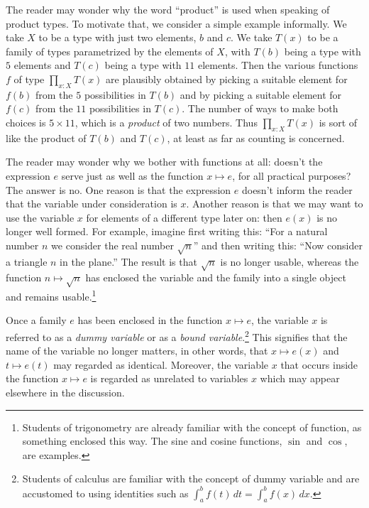 The reader may wonder why the word ``product'' is used when speaking of product types.  To motivate that, we consider a simple example
informally.  We take $X$ to be a type with just two elements, $b$ and $c$.  We take $T(x)$ to be a family of types parametrized by the elements
of $X$, with $T(b)$ being a type with $5$ elements and $T(c)$ being a type with $11$ elements.  Then the various functions $f$ of type
$\prod_{x:X} T(x)$ are plausibly obtained by picking a suitable element for $f(b)$ from the $5$ possibilities in $T(b)$ and by picking a
suitable element for $f(c)$ from the $11$ possibilities in $T(c)$.  The number of ways to make both choices is $5 \times 11$, which is a
\emph{product} of two numbers.  Thus $\prod_{x:X} T(x)$ is sort of like the product of $T(b)$ and $T(c)$, at least as far as counting is
concerned.

The reader may wonder why we bother with functions at all: doesn't the expression $e$ serve just as well as the function $x \mapsto e$, for all
practical purposes?  The answer is no.  One reason is that the expression $e$ doesn't inform the reader that the variable under consideration is
$x$.  Another reason is that we may want to use the variable $x$ for elements of a different type later on: then $e(x)$ is no longer well
formed.  For example, imagine first writing this: ``For a natural number $n$ we consider the real number $\sqrt n$'' and then writing this:
``Now consider a triangle $n$ in the plane.''  The result is that $\sqrt n$ is no longer usable, whereas the function $n \mapsto \sqrt n$ has
enclosed the variable and the family into a single object and remains usable.\footnote{Students of trigonometry are already familiar with the
concept of function, as something enclosed this way.  The sine and cosine functions, $\sin$ and $\cos$, are examples.}

Once a family $e$ has been enclosed in the function $x \mapsto e$, the variable $x$ is referred to as a \emph{dummy variable} or as a \emph{bound variable}.\footnote{Students of calculus are familiar with the concept of dummy variable
and are accustomed to using identities such as $\int_a^b f(t)\,dt = \int_a^b f(x)\,dx$.} This signifies that the name of the variable no longer
matters, in other words, that $x \mapsto e(x)$ and $t \mapsto e(t)$ may regarded as identical.  Moreover, the variable $x$ that occurs inside
the function $x \mapsto e$ is regarded as unrelated to variables $x$ which may appear elsewhere in the discussion.

